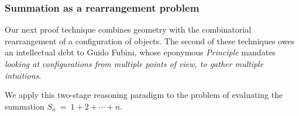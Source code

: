 \subsubsection{Summation as a rearrangement problem}
\label{sec:summation-via-Fubini}

Our next proof technique combines geometry with the combinatorial rearrangement of a configuration of objects.  The second of these techniques owes an intellectual debt to Guido Fubini, whose eponymous {\em Principle} mandates {\em looking at configurations from multiple points of view, to gather multiple intuitions}.
 

\smallskip

We apply this two-stage reasoning paradigm to the problem of evaluating the summation $S_n \ = \ 1 + 2 + \cdots + n$.

\smallskip


